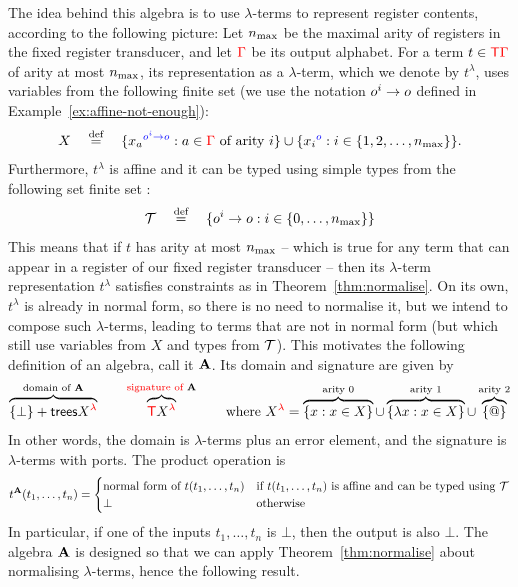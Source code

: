  The idea behind this algebra is to use  $\lambda$-terms to represent register contents, according to the following picture:
    Let  $n_{\mathrm{max}}$  be the maximal arity of registers in the fixed register transducer, and let  ${\color{red}{\Gamma}}$ be its  output alphabet. For a term $t \in {\color{red}{\mathsf T}} {\color{red}{\Gamma}}$ of arity at most $n_{\mathrm{max}}$, its representation as a  $\lambda$-term, which we denote by $t^\lambda$,  uses variables from the following finite set (we use the notation $o^i \to o$ defined in Example~\ref{ex:affine-not-enough}):
\begin{align*}
X  \quad \stackrel{\text{def}}= \quad \{{x_a}^{\color{blue}{o^i \to o}} : a \in {\color{red}{\Gamma}} \text{ of arity $i$}\} \cup \{{x_i}^{\color{blue}{o}} : i \in \{1,2,\ldots,n_{\mathrm{max}} \}\}.
\end{align*}
Furthermore, $t^\lambda$ is affine and it can be typed using simple types  from  the following set finite set :
\begin{align*}
    {\mathcal T} \quad \stackrel{\text{def}}= \quad \{o^i \to o : i \in \{0,\ldots,n_{\mathrm{max}}\}\}
\end{align*}
This means that if $t$ has arity at most $n_{\mathrm{max}}$ -- which is true for any term that can appear in a register of our fixed register transducer -- then its $\lambda$-term representation $t^\lambda$ satisfies constraints as in Theorem~\ref{thm:normalise}.  On its own, $t^\lambda$ is already in normal form, so there is no need to normalise it, but we intend to compose  such $\lambda$-terms, leading to terms that are not in normal form (but which still use variables from $X$ and types from ${\mathcal T}$). 
This motivates the  following definition of an algebra, call it ${\color{black}\mathbf A}$. Its domain and signature are given by 
\begin{align*}
\overbrace{\{\bot\} + \mathsf {trees} {X}^{{\color{red}{\lambda}}}}^{{\color{black}\text{domain of }}{\color{black}\mathbf A}}  \qquad \overbrace{ {\color{red}{\mathsf T}} {X}^{{\color{red}{\lambda}}}}^{{\color{red}{\text{signature of }}}{\color{black}\mathbf A}} \qquad \text{where }{X}^{{\color{red}{\lambda}}} = {\overbrace{\{x : x \in X\}}^{\text{arity 0}} \cup \overbrace{\{\lambda x : x \in X\}}^{\text{arity 1}} \cup  \overbrace{\{@\}}^{\text{arity 2}}}
\end{align*}
In other words, the domain is $\lambda$-terms plus an error element, and the signature is $\lambda$-terms  with ports. The   product operation is 
\begin{align*}
t^{\color{black}\mathbf A}(t_1,\ldots,t_n) = \begin{cases}
    \text{normal form of $t(t_1,\ldots,t_n)$} & \text{if $t(t_1,\ldots,t_n)$ is affine and can be typed using ${\mathcal T}$}\\
    \bot & \text{otherwise}
\end{cases}
\end{align*}
In particular, if one of the inputs $t_1,\ldots,t_n$ is $\bot$, then the output is also $\bot$.  The algebra ${\color{black}\mathbf A}$ is designed so that we can apply Theorem~\ref{thm:normalise} about normalising $\lambda$-terms, hence the following result.

